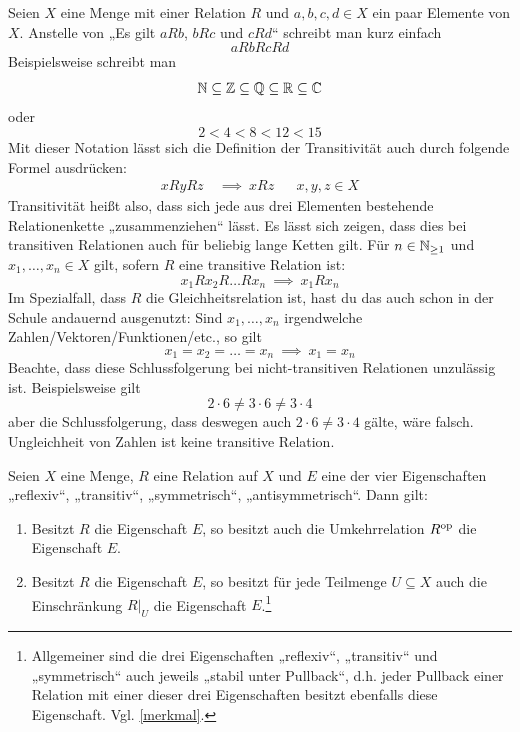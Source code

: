 \begin{bem} \label{kettenfalten}
    Seien $X$ eine Menge mit einer Relation $R$ und $a,b,c,d\in X$ ein paar Elemente von $X$. Anstelle von „Es gilt $aRb$, $bRc$ und $cRd$“ schreibt man kurz einfach
        \[ aRbRcRd \]
    Beispielsweise schreibt man
        \[ \mathbb N \subseteq \mathbb Z\subseteq\mathbb Q\subseteq\mathbb R\subseteq \mathbb C \]
    oder
        \[ 2 < 4 < 8 < 12 < 15 \]
    Mit dieser Notation lässt sich die Definition der Transitivität auch durch folgende Formel ausdrücken:
    \begin{align*}
        xRyRz \ &\implies\ xRz && x,y,z\in X
    \end{align*}
    Transitivität heißt also, dass sich jede aus drei Elementen bestehende Relationenkette „zusammenziehen“ lässt. Es lässt sich zeigen, dass dies bei transitiven Relationen auch für beliebig lange Ketten gilt. Für $n\in \mathbb N_{\ge 1}$ und $x_1,\dots , x_n\in X$ gilt, sofern $R$ eine transitive Relation ist:
        \[ x_1Rx_2R\ldots Rx_n \ \implies\ x_1Rx_n\]
    Im Spezialfall, dass $R$ die Gleichheitsrelation ist, hast du das auch schon in der Schule andauernd ausgenutzt: Sind $x_1,\dots , x_n$ irgendwelche Zahlen/Vektoren/Funktionen/etc., so gilt
        \[ x_1=x_2=\ldots = x_n \ \implies\ x_1=x_n\]
    Beachte, dass diese Schlussfolgerung bei nicht-transitiven Relationen unzulässig ist. Beispielsweise gilt
        \[ 2\cdot 6 \neq 3\cdot 6\neq 3\cdot 4 \]
    aber die Schlussfolgerung, dass deswegen auch $2\cdot 6\neq 3\cdot 4$ gälte, wäre falsch. Ungleichheit von Zahlen ist keine transitive Relation.
\end{bem}


\begin{satz} \label{releigstabil}
    Seien $X$ eine Menge, $R$ eine Relation auf $X$ und $E$ eine der vier Eigenschaften „reflexiv“, „transitiv“, „symmetrisch“, „antisymmetrisch“. Dann gilt:
    \begin{enumerate}
        \item Besitzt $R$ die Eigenschaft $E$, so besitzt auch die Umkehrrelation $R^{\mathrm{op}}$ die Eigenschaft $E$.
        \item Besitzt $R$ die Eigenschaft $E$, so besitzt für jede Teilmenge $U\subseteq X$ auch die Einschränkung $R\vert_U$ die Eigenschaft $E$.\footnote{Allgemeiner sind die drei Eigenschaften „reflexiv“, „transitiv“ und „symmetrisch“ auch jeweils „stabil unter Pullback“, d.h. jeder Pullback einer Relation mit einer dieser drei Eigenschaften besitzt ebenfalls diese Eigenschaft. Vgl. \cref{merkmal}.}
    \end{enumerate}
\end{satz}


